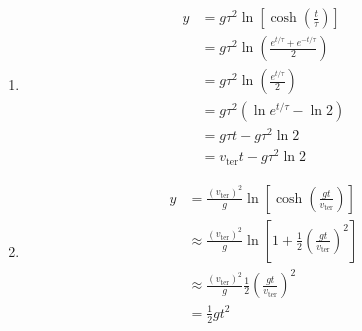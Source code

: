 \documentclass{article}
\begin{document}
\begin{enumerate}
  \item

        \begin{align*}
          y & = g \tau^2 \ln \left[ \cosh \left( \frac{t}{\tau} \right) \right]    \\
            & = g \tau^2 \ln \left( \frac{e^{t / \tau} + e^{-t / \tau}}{2} \right) \\
            & = g \tau^2 \ln \left( \frac{e^{t / \tau}}{2} \right)                 \\
            & = g \tau^2 (\ln e^{t / \tau} - \ln 2)                                \\
            & = g \tau t - g \tau^2 \ln 2                                          \\
            & = v_\text{ter} t - g \tau^2 \ln 2
        \end{align*}

  \item

        \begin{align*}
          y & = \frac{(v_\text{ter})^2}{g} \ln \left[ \cosh \left( \frac{g t}{v_\text{ter}} \right) \right]                  \\
            & \approx \frac{(v_\text{ter})^2}{g} \ln \left[ 1 + \frac{1}{2} \left( \frac{g t}{v_\text{ter}} \right)^2\right] \\
            & \approx \frac{(v_\text{ter})^2}{g} \frac{1}{2} \left( \frac{g t}{v_\text{ter}} \right)^2                       \\
            & = \frac{1}{2} g t^2
        \end{align*}
\end{enumerate}

\setcounter{subsection}{38}
\subsection{}
\end{document}
